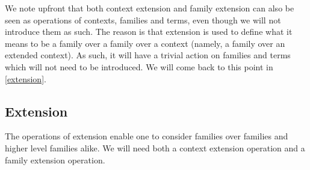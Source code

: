 \begin{comment}
Generally, 
each operation should
have an action on contexts, on families and on terms at the `appropriate level'
and should be compatible with each of the operations we introduce here. In
that will become more practical after the theory of contexts, families and terms
is formulated, this means that when we will write down a type theory that
interprets itself in \autoref{ttmodels}, each of the notions of
extension, empty family, weakening, substitution and identity terms are going to be internalized
as terms of the theory and all terms are going to be compatible with these.
That vague idea will be our guiding light.

So in principle, the introductions of each of the empty context, extension,
weakening, substitution and identity terms should come in three parts. In 
practice, they do not all come in three parts.

Apart from the empty context, there will indeed be an empty family and a term
of the empty family (which will be deemed unique). But extension will
not have an explicit action `at the level of families' since extension
is used to define higher families and the action would have to be trivial
anyway. The empty context and extension provide the essentials of the rest of
the theory in the sense that higher families are families over extensions,
contexts are families over the empty context and the `action on families' of
any operation applied to families over the empty context is the same as the
original operation. Thus, when we have introduced the operations of weakening
and substitution we will see that they also have an `action on the terms of 
contexts'. We will state the relevant judgmental equality rules for the empty
context in this section rather than in the next, since they are required to
state that the action on families of an operation is compatible with the
original operation.
\end{comment}

We note upfront that both context extension and family extension can also be
seen as operations of contexts, families and terms, even though we will not
introduce them as such. The reason is that extension is used to define what it
means to be a family over a family over a context (namely, a family over an
extended context). As such, it will have a trivial action on families and terms
which will not need to be introduced. We will come back to this point in
\autoref{extension}.

\subsection{Extension}
\label{extension}
The operations of extension enable one to consider families over
families and higher level families alike. We will need both a context extension
operation and a family extension operation.

